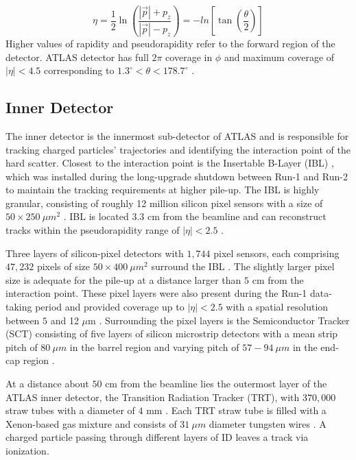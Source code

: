 \begin{equation}
    \eta = \frac{1}{2}\ln{ \left( \frac{ |\vec{p}|+p_{z}}{ |\vec{p}| -p_{z}} \right) } = -ln { \left[ \tan \left( \frac{\theta}{2}\right) \right] } 
    \label{eqn:PseudoRapidity}
\end{equation}
Higher values of rapidity and pseudorapidity refer to the forward region of the detector. ATLAS detector has full $2\pi$ coverage in $\phi$ and maximum coverage of $|\eta| < 4.5$ corresponding to $1.3^{\circ} < \theta < 178.7^{\circ} $ \cite{ATLAS}. 

\subsection{Inner Detector}
\label{subsec:ID}
The inner detector is the innermost sub-detector of ATLAS and is responsible for tracking charged particles' trajectories and identifying the interaction point of the hard scatter. Closest to the interaction point is the Insertable B-Layer (IBL) \cite{ATLAS_IBL}, which was installed during the long-upgrade shutdown between Run-1 and Run-2 to maintain the tracking requirements at higher pile-up. The IBL is highly granular, consisting of roughly 12 million silicon pixel sensors with a size of $50\times 250 ~\mu m^2$ \cite{ATLAS_IBL}. IBL is located $3.3$ cm from the beamline and can reconstruct tracks within the pseudorapidity range of $|\eta|<2.5$ \cite{ATLAS_IBL}. 

Three layers of silicon-pixel detectors with $1,744$ pixel sensors, each comprising $47,232$ pixels of size $50\times 400 ~\mu m^2$ surround the IBL \cite{ID_Pixel}. The slightly larger pixel size is adequate for the pile-up at a distance larger than $5$ cm from the interaction point. These pixel layers were also present during the Run-1 data-taking period and provided coverage up to $|\eta|<2.5$ with a spatial resolution between $5$ and 12 $\mu$m \cite{ID_Pixel}. Surrounding the pixel layers is the Semiconductor Tracker (SCT) consisting of five layers of silicon microstrip detectors with a mean strip pitch of $80 ~\mu m$ in the barrel region and varying pitch of  $57-94 ~\mu m$ in the end-cap region \cite{ID_Strips}. 

At a distance about $50$ cm from the beamline lies the outermost layer of the ATLAS inner detector, the Transition Radiation Tracker (TRT), with $370,000$ straw tubes with a diameter of $4$ mm \cite{ID_TRT}. Each TRT straw tube is filled with a Xenon-based gas mixture and consists of $31~\mu m$ diameter tungsten wires \cite{ID_TRT}. A charged particle passing through different layers of ID leaves a track via ionization. 

